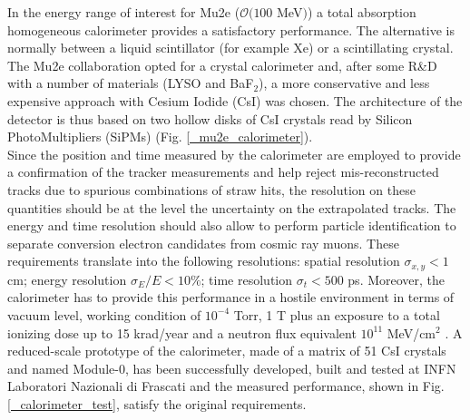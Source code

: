 \documentclass[12pt,a4paper,openright, oneside, titlepage]{book} %
\begin{document}
\noindent
In the energy range of interest for Mu2e ($ \mathcal{O}(100$ MeV$)$) a total absorption homogeneous calorimeter provides a satisfactory performance. 
The alternative is normally between a liquid scintillator (for example Xe) or a scintillating crystal. 
The Mu2e collaboration opted for a crystal calorimeter and, after some R\&D with a number of materials (LYSO and BaF$_2$), a more conservative and less expensive approach with Cesium Iodide (CsI) was chosen. 
The architecture of the detector is thus based on two hollow disks of CsI crystals read by Silicon PhotoMultipliers (SiPMs) (Fig. \ref{_mu2e_calorimeter}).\\ 
Since the position and time measured by the calorimeter are employed to provide a confirmation of the tracker measurements and help reject mis-reconstructed tracks due to spurious combinations of straw hits, the resolution on these quantities should be at the level the uncertainty on the extrapolated tracks. 
The energy and time resolution should also allow to perform particle identification to separate conversion electron candidates from cosmic ray muons. 
These requirements translate into the following resolutions: 
spatial resolution $\sigma_{x,y}<1$ cm; 
energy resolution $\sigma_E/E <10\%$; 
time resolution $\sigma_t < 500$ ps.
Moreover, the calorimeter has to provide this performance in a hostile environment in terms of vacuum level, working condition of $10^{-4}$ Torr, 1 T plus an exposure to a total ionizing dose up to 15 krad/year and a neutron flux equivalent $10^{11}$ MeV/cm$^2$ \cite{Donghia:2019}.
A reduced-scale prototype of the calorimeter, made of a matrix of 51 CsI crystals and named Module-0, has been successfully developed, built and tested at INFN Laboratori Nazionali di Frascati and the measured performance, shown in Fig. \ref{_calorimeter_test}, satisfy the original requirements.
\end{document}

